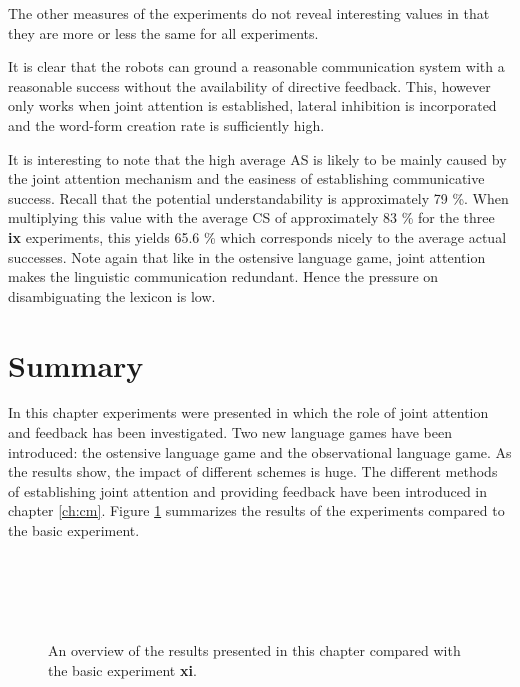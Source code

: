 The other measures of the experiments do not reveal interesting values in that they are more or less the same for all experiments. 

\p
It is clear that the robots can ground a reasonable communication system with a reasonable success without the availability of directive feedback. This, however only works when joint attention is established, lateral inhibition is incorporated and the word-form creation rate is sufficiently high.

It is interesting to note that the high average AS is likely to be mainly caused by the joint attention mechanism and the easiness of establishing communicative success. Recall that the potential understandability is approximately 79 \%. When multiplying this value with the average CS of approximately 83 \% for the three {\bf ix} experiments, this yields 65.6 \% which corresponds nicely to the average actual successes. Note again that like in the ostensive language game, joint attention makes the linguistic communication redundant. Hence the pressure on disambiguating the lexicon is low. 


\section{Summary}\label{s:feed:summary}

In this chapter experiments were presented in which the role of joint attention and feedback has been investigated. Two new language games have been introduced: the ostensive language game and the observational language game. As the results show, the impact of different schemes is huge. The different methods of establishing joint attention and providing feedback have been introduced in chapter \ref{ch:cm}. Figure \ref{f:feed:results} summarizes the results of the experiments compared to the basic experiment.

\begin{figure}
\centering
{}
\\
\\
\end{figure}
\begin{figure}[t]
\centering
{}\\
\caption{An overview of the results presented in this chapter compared with the basic experiment {\bf xi}.}
\label{f:feed:results}
\end{figure}


